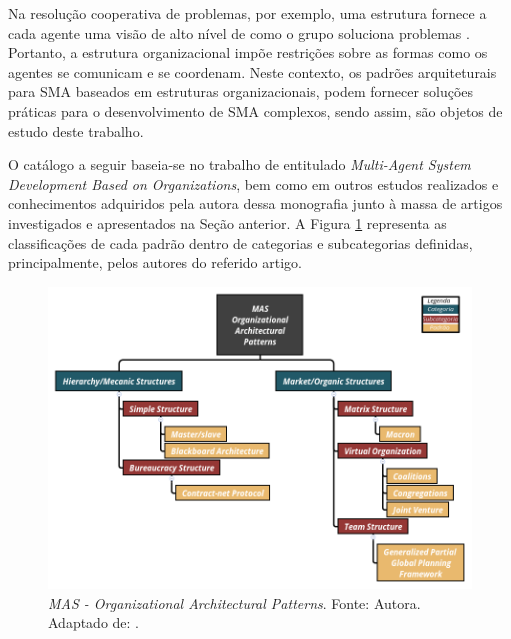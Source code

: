 Na resolução cooperativa de problemas, por exemplo, uma estrutura fornece a cada agente uma visão de alto nível de como o grupo soluciona problemas \cite{sycara1998multiagent}. Portanto, a estrutura organizacional impõe restrições sobre as formas como os agentes se comunicam e se coordenam. Neste contexto, os padrões arquiteturais para SMA baseados em estruturas organizacionais, podem fornecer soluções práticas para o desenvolvimento de SMA complexos, sendo assim, são objetos de estudo deste trabalho.

O catálogo a seguir baseia-se no trabalho de  entitulado \textit{Multi-Agent System Development Based on Organizations}, bem como em outros estudos realizados e conhecimentos adquiridos pela autora dessa monografia junto à massa de artigos investigados e apresentados na Seção anterior. A Figura \ref{fig:my_patterns} representa as classificações de cada padrão dentro de categorias e subcategorias definidas, principalmente, pelos autores do referido artigo.



\begin{figure}[H]
    \centering
    \includegraphics[scale=0.47]{figuras/mas_patterns.png}
    \caption{\textit{MAS - Organizational Architectural Patterns}. Fonte: Autora. Adaptado de: .}
    \label{fig:my_patterns}
\end{figure}










